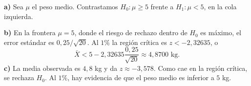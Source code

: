 \textbf{a)} Sea $\mu$ el peso medio. Contrastamos $H_0:\mu\ge5$ frente a $H_1:\mu<5$, en la cola izquierda.

\textbf{b)} En la frontera $\mu=5$, donde el riesgo de rechazo dentro de $H_0$ es máximo, el error estándar es $0{,}25/\sqrt{20}$. Al $1\%$ la región crítica es $z<-2{,}32635$, o
\[
\bar X<5-2{,}32635\frac{0{,}25}{\sqrt{20}}\approx4{,}8700\text{ kg}.
\]
\textbf{c)} La media observada es $4{,}8$ kg y da $z\approx-3{,}578$. Como cae en la región crítica, se rechaza $H_0$. Al $1\%$, hay evidencia de que el peso medio es inferior a $5$ kg.

